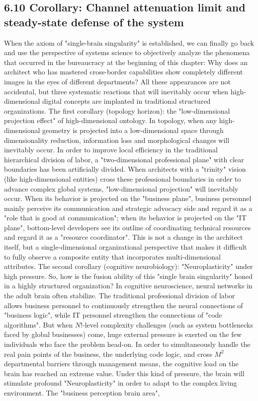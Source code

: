 \documentclass[11pt,a4paper]{article}
\begin{document}
\subsection*{6.10 Corollary: Channel attenuation limit and steady-state defense of the system}


When the axiom of "single-brain singularity" is established, we can finally go back and use the perspective of systems science to objectively analyze the phenomena that occurred in the bureaucracy at the beginning of this chapter: Why does an architect who has mastered cross-border capabilities show completely different images in the eyes of different departments? All these appearances are not accidental, but three systematic reactions that will inevitably occur when high-dimensional digital concepts are implanted in traditional structured organizations. The first corollary (topology horizon): the "low-dimensional projection effect" of high-dimensional ontology. In topology, when any high-dimensional geometry is projected into a low-dimensional space through dimensionality reduction, information loss and morphological changes will inevitably occur. In order to improve local efficiency in the traditional hierarchical division of labor, a "two-dimensional professional plane" with clear boundaries has been artificially divided. When architects with a "trinity" vision (like high-dimensional entities) cross these professional boundaries in order to advance complex global systems, "low-dimensional projection" will inevitably occur. When its behavior is projected on the "business plane", business personnel mainly perceive its communication and strategic advocacy side and regard it as a "role that is good at communication"; when its behavior is projected on the "IT plane", bottom-level developers see its outline of coordinating technical resources and regard it as a "resource coordinator". This is not a change in the architect itself, but a single-dimensional organizational perspective that makes it difficult to fully observe a composite entity that incorporates multi-dimensional attributes. The second corollary (cognitive neurobiology): "Neuroplasticity" under high pressure. So, how is the fusion ability of this "single brain singularity" honed in a highly structured organization? In cognitive neuroscience, neural networks in the adult brain often stabilize. The traditional professional division of labor allows business personnel to continuously strengthen the neural connections of "business logic", while IT personnel strengthen the connections of "code algorithms". But when $N!$-level complexity challenges (such as system bottlenecks faced by global businesses) come, huge external pressure is exerted on the few individuals who face the problem head-on. In order to simultaneously handle the real pain points of the business, the underlying code logic, and cross $M^2$ departmental barriers through management means, the cognitive load on the brain has reached an extreme value. Under this kind of pressure, the brain will stimulate profound "Neuroplasticity" in order to adapt to the complex living environment. The "business perception brain area", 
\end{document}
